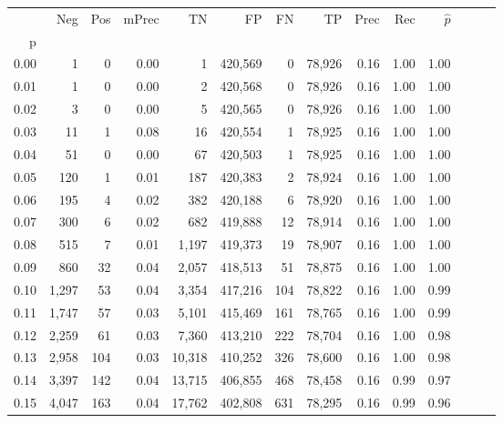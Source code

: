 \begin{tabular}{rrrrrrrrrrrrrr}
\toprule
{} &    Neg &    Pos & mPrec &       TN &       FP &      FN &      TP &  Prec &   Rec & $\hat{p}$ \\
p    &        &        &       &          &          &         &         &       &       &           \\
\midrule
0.00 &      1 &      0 &  0.00 &        1 &  420,569 &       0 &  78,926 &  0.16 &  1.00 &      1.00 \\
0.01 &      1 &      0 &  0.00 &        2 &  420,568 &       0 &  78,926 &  0.16 &  1.00 &      1.00 \\
0.02 &      3 &      0 &  0.00 &        5 &  420,565 &       0 &  78,926 &  0.16 &  1.00 &      1.00 \\
0.03 &     11 &      1 &  0.08 &       16 &  420,554 &       1 &  78,925 &  0.16 &  1.00 &      1.00 \\
0.04 &     51 &      0 &  0.00 &       67 &  420,503 &       1 &  78,925 &  0.16 &  1.00 &      1.00 \\
0.05 &    120 &      1 &  0.01 &      187 &  420,383 &       2 &  78,924 &  0.16 &  1.00 &      1.00 \\
0.06 &    195 &      4 &  0.02 &      382 &  420,188 &       6 &  78,920 &  0.16 &  1.00 &      1.00 \\
0.07 &    300 &      6 &  0.02 &      682 &  419,888 &      12 &  78,914 &  0.16 &  1.00 &      1.00 \\
0.08 &    515 &      7 &  0.01 &    1,197 &  419,373 &      19 &  78,907 &  0.16 &  1.00 &      1.00 \\
0.09 &    860 &     32 &  0.04 &    2,057 &  418,513 &      51 &  78,875 &  0.16 &  1.00 &      1.00 \\
0.10 &  1,297 &     53 &  0.04 &    3,354 &  417,216 &     104 &  78,822 &  0.16 &  1.00 &      0.99 \\
0.11 &  1,747 &     57 &  0.03 &    5,101 &  415,469 &     161 &  78,765 &  0.16 &  1.00 &      0.99 \\
0.12 &  2,259 &     61 &  0.03 &    7,360 &  413,210 &     222 &  78,704 &  0.16 &  1.00 &      0.98 \\
0.13 &  2,958 &    104 &  0.03 &   10,318 &  410,252 &     326 &  78,600 &  0.16 &  1.00 &      0.98 \\
0.14 &  3,397 &    142 &  0.04 &   13,715 &  406,855 &     468 &  78,458 &  0.16 &  0.99 &      0.97 \\
0.15 &  4,047 &    163 &  0.04 &   17,762 &  402,808 &     631 &  78,295 &  0.16 &  0.99 &      0.96 \\

\end{tabular}
